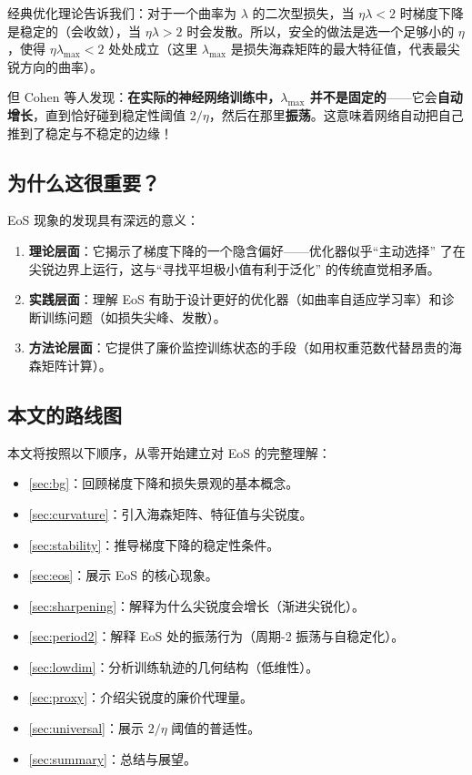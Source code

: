 \documentclass[11pt,a4paper]{ctexart}
\newcommand{\lmax}{\lambda_{\max}}
\begin{document}
经典优化理论告诉我们：对于一个曲率为 $\lambda$ 的二次型损失，当 $\eta\lambda < 2$ 时梯度下降是稳定的（会收敛），当 $\eta\lambda > 2$ 时会发散。所以，安全的做法是选一个足够小的 $\eta$，使得 $\eta\lmax < 2$ 处处成立（这里 $\lmax$ 是损失海森矩阵的最大特征值，代表最尖锐方向的曲率）。

但 Cohen 等人发现：\textbf{在实际的神经网络训练中，$\lmax$ 并不是固定的}——它会\textbf{自动增长}，直到恰好碰到稳定性阈值 $2/\eta$，然后在那里\textbf{振荡}。这意味着网络自动把自己推到了稳定与不稳定的边缘！

\subsection{为什么这很重要？}

EoS 现象的发现具有深远的意义：

\begin{enumerate}[leftmargin=2em]
  \item \textbf{理论层面}：它揭示了梯度下降的一个隐含偏好——优化器似乎``主动选择'' 了在尖锐边界上运行，这与``寻找平坦极小值有利于泛化'' 的传统直觉相矛盾。
  \item \textbf{实践层面}：理解 EoS 有助于设计更好的优化器（如曲率自适应学习率）和诊断训练问题（如损失尖峰、发散）。
  \item \textbf{方法论层面}：它提供了廉价监控训练状态的手段（如用权重范数代替昂贵的海森矩阵计算）。
\end{enumerate}

\subsection{本文的路线图}

本文将按照以下顺序，从零开始建立对 EoS 的完整理解：

\begin{itemize}[leftmargin=2em]
  \item \cref{sec:bg}：回顾梯度下降和损失景观的基本概念。
  \item \cref{sec:curvature}：引入海森矩阵、特征值与尖锐度。
  \item \cref{sec:stability}：推导梯度下降的稳定性条件。
  \item \cref{sec:eos}：展示 EoS 的核心现象。
  \item \cref{sec:sharpening}：解释为什么尖锐度会增长（渐进尖锐化）。
  \item \cref{sec:period2}：解释 EoS 处的振荡行为（周期-2 振荡与自稳定化）。
  \item \cref{sec:lowdim}：分析训练轨迹的几何结构（低维性）。
  \item \cref{sec:proxy}：介绍尖锐度的廉价代理量。
  \item \cref{sec:universal}：展示 $2/\eta$ 阈值的普适性。
  \item \cref{sec:summary}：总结与展望。
\end{itemize}
\end{document}
